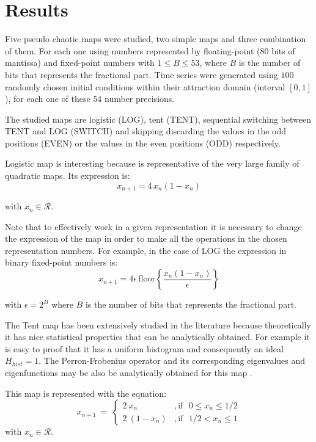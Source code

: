 \section{Results}\label{sec:resultados}

Five pseudo chaotic maps were studied, two simple maps and three combination of them.
For each one using numbers represented by floating-point (80 bits of mantissa) and  fixed-point numbers with $1\leq B \leq 53$, where $B$ is the number of bits that represents the fractional part.
Time series were generated using $100$ randomly chosen initial conditions within their attraction domain (interval $[0,1]$), for each one of these $54$ number precisions.

The studied maps are logistic (LOG), tent (TENT), sequential switching between TENT and LOG (SWITCH) and skipping discarding the values in the odd positions (EVEN) or the values in the even positions (ODD) respectively.

Logistic map is interesting because is representative of the very large family of quadratic maps.
Its expression is:
%
\begin{equation}\label{eq:logimap}
x_{n+1}=4\,x_{n}(1-x_{n}) 
\end{equation}

\noindent with $x_n\in\mathcal{R}$.

Note that to effectively work in a given representation it is necessary to change the expression of the map in order to make all the operations in the chosen representation numbers. For example, in the case of LOG the expression in binary fixed-point numbers is:%
%
\begin{equation}\label{eq:logimapB2}
x_{n+1}=4 \epsilon \,\text{floor}\left\{\frac{x_n(1-x_n)}{\epsilon}\right\}
\end{equation}

\noindent with $\epsilon = 2^B$ where $B$ is the number of bits that represents the fractional part.

The Tent map has been extensively studied in the literature because theoretically it has nice statistical properties that can be analytically obtained.
For example it is easy to proof that it has a uniform histogram and consequently an ideal $H_{hist}=1$.
The Perron-Frobenius operator and its corresponding eigenvalues and eigenfunctions may be also be analytically obtained for this map \cite{Lasota}.

This map is represented with the equation:
\begin{equation}\label{eq:tentmap}
x_{n+1}~=~ \left\{ \begin{array}{ll}
2~{x_n} &, \textrm{if ~$0\leq x_n\leq 1/2$}\\
2~(1-{x_n}) &, \textrm{if ~$1/2<x_n\leq 1$} 
\end{array} \right. 
\end{equation}
with $x_n\in\mathcal{R}$.

